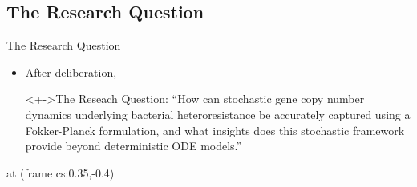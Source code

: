 \documentclass[aspectratio=169, onlytextwidth,  notheorems, sOuRcEs, fleqn, leqno, ]{RUCPresentation}
\newcounter{reaction}
\begin{document}
\subsection{The Research Question}
\begin{frame}[t]{The Research Question}

    \vspace{2em}


    \begin{itemize}[<+->]
        \item After  deliberation,
            \begin{block}<+->{The Reseach Question:}
                ``How can stochastic gene copy number dynamics underlying bacterial
                heteroresistance be accurately captured using a Fokker-Planck formulation,
                and what insights does this stochastic framework provide beyond deterministic ODE models.''
            \end{block}
    \end{itemize}


      at (frame cs:0.35,-0.4) {%
        }
\end{frame}
\end{document}
